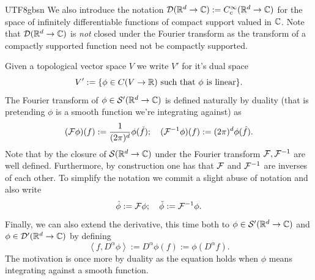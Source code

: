 \documentclass[12pt]{article}
\newcommand{\br}[1]{\left\langle#1\right\rangle}
\begin{document}
\begin{CJK*}{UTF8}{gbsn}
	We also introduce the notation $\mathcal{D}({\mathbb R}^d\to\mathbb{C}):=C_c^\infty({\mathbb R}^d\to\mathbb{C})$ for the space of infinitely differentiable functions of compact support valued in $\mathbb{C}$. Note that $\mathcal{D}({\mathbb R}^d\to\mathbb{C})$ is \emph{not} closed under the Fourier transform as the transform of a compactly supported function need not be compactly supported.

	Given a topological vector space $V$ we write  $V'$ for it's dual space
	\begin{equation*}
		V':=\{\phi\in C(V\to{\mathbb R}) \text{ such that } \phi \text{ is linear}   \}.
	\end{equation*}
	The Fourier transform of $\phi \in {\mathcal S}'({\mathbb R}^d\to\mathbb{C})$ is defined naturally by duality (that is pretending $\phi$ is a smooth function we're integrating against) as
	\begin{equation*}
		(\mathcal{F}\phi)(f):=\frac{1}{(2\pi)^d} \phi(\check{f});\quad (\mathcal{F}^{-1}\phi)(f):=(2\pi )^d\phi(\hat{f}) .
	\end{equation*}
	Note that by the closure of ${\mathcal S}({\mathbb R}^d\to \mathbb{C})$ under the Fourier transform $\mathcal{F},\mathcal{F}^{-1}$ are well defined. Furthermore, by construction one has that $\mathcal{F}$ and $\mathcal{F}^{-1}$ are inverses of each other. To simplify the notation we commit a slight abuse of notation and also write $$\hat{\phi}:=\mathcal{F}\phi;\quad  \check{\phi}:= \mathcal{F}^{-1}\phi.$$
	Finally, we can also extend the derivative, this time both to $\phi\in\mathcal{S}'({\mathbb R}^d\to\mathbb{C})$ and $\phi\in\mathcal{D}'({\mathbb R}^d\to\mathbb{C})$ by defining
	\begin{equation*}
		\br{f,D^\alpha\phi}:=D^\alpha \phi(f):=\phi(D^\alpha f).
	\end{equation*}
	The motivation is once more by duality as the equation holds when $\phi$ means integrating against a smooth function.

\end{CJK*}
\end{document}
